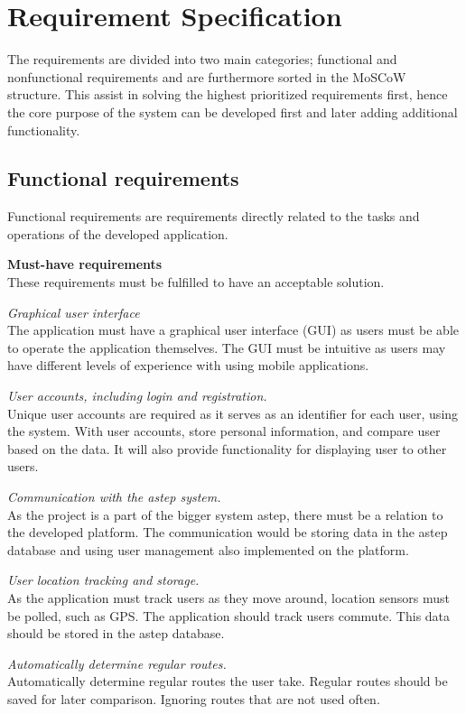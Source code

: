 \section{Requirement Specification}\label{sec:req}
The requirements are divided into two main categories; functional and nonfunctional requirements and are furthermore sorted in the MoSCoW \cite{moscow} structure.
This assist in solving the highest prioritized requirements first, hence the core purpose of the system can be developed first and later adding additional functionality.

\subsection{Functional requirements}
Functional requirements are requirements directly related to the tasks and operations of the developed application.

\textbf{Must-have requirements}\\
These requirements must be fulfilled to have an acceptable solution.

\textit{Graphical user interface}\\
The application must have a graphical user interface (GUI) as users must be able to operate the application themselves. 
The GUI must be intuitive as users may have different levels of experience with using mobile applications.

\textit{User accounts, including login and registration.}\\
Unique user accounts are required as it serves as an identifier for each user, using the system. 
With user accounts, store personal information, and compare user based on the data. 
It will also provide functionality for displaying user to other users.

\textit{Communication with the \gls{astep} system.}\\
As the project is a part of the bigger system \gls{astep}, there must be a relation to the developed platform. 
The communication would be storing data in the \gls{astep} database and using user management also implemented on the platform.

\textit{User location tracking and storage.}\\
As the application must track users as they move around, location sensors must be polled, such as GPS. 
The application should track users commute.
This data should be stored in the \gls{astep} database.

\textit{Automatically determine regular routes.}\\
Automatically determine regular routes the user take. 
Regular routes should be saved for later comparison. 
Ignoring routes that are not used often.

